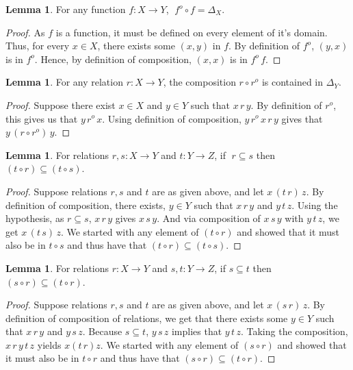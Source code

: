 \documentclass[a4paper]{article}
\theoremstyle{definition}
\newtheorem{lemma}[theorem]{Lemma}
\begin{document}
			\begin{lemma}
				For any function $f:X \to Y$, $\; f^o \circ f=\Delta_X$.
			\end{lemma}
			\begin{proof}\setcounter{equation}{0}

				As $f$ is a function, it must be defined on every element of it's domain. Thus, for every
				$x \in X$, there exists some $(x,y)$ in $f$. By definition of $f^o$, $(y,x)$ is in $f^o$.
				Hence, by definition of composition, $(x,x)$ is in $f^o \,f$.
			\end{proof}
			\begin{lemma}
				For any relation $r:X \to Y$, the composition $r\circ r^o$ is contained in $\Delta_Y$.
			\end{lemma}
			\begin{proof}\setcounter{equation}{0}

				Suppose there exist $x \in X$ and $y \in Y$ such that
				$x\,r\,y$. By definition of $r^o$, this
				gives us that $y\, r^o \,x$. Using definition of composition,
				$y\, r^o \,x \,r\,y$ gives that	$y\, (r \circ r^o)\, y$.
			\end{proof}
			\begin{lemma} For relations $r,s:X\to Y$ and $t:Y\to Z$, if $\;r \subseteq s$ then $(t \circ r) \subseteq (t \circ s)$.
			\end{lemma}
			\begin{proof}\setcounter{equation}{0}

				Suppose relations $r,s$ and $t$ are as given above, and let $x \,(t \, r)\,z$.
				By definition of composition, there
				exists, $y \in Y$ such that $x\,r\,y$ and $y\,t\,z$.
				Using the hypothesis, as $r \subseteq  s $,
				$x\,r\,y$ gives $x\,s\,y$. And via composition of $x\,s\,y$ with $y \, t \, z $, we get
				$x\,(t\,s)\, z$. We started with any element of $(t \circ r)$ and showed that
				it must also be in $t \circ s$ and thus have that $(t \circ r) \subseteq (t \circ s)$.
			\end{proof}
			\begin{lemma} For relations $r:X\to Y$ and $s,t:Y\to Z$, if $s\subseteq t$ then
				$(s \circ r) \subseteq (t \circ r)$.
			\end{lemma}
			\begin{proof}\setcounter{equation}{0}

				Suppose relations $r,s$ and $t$ are as given above, and let  $x \,(s \, r)\,z$.
				By definition of composition of relations, we get that there exists
				some $y \in Y$ such that $x\,r\,y$ and $y\,s\,z$. Because $s \subseteq t$, $y\,s\,z$
				implies that $y\,t\,z$. Taking the composition, $x\,r\,y\,t\,z$ yields $x(t\,r)z$.
				We started with any element of $(s \circ r)$ and showed that it must also be in
				$t \circ r$ and thus have that $(s \circ r) \subseteq (t \circ r)$.
			\end{proof}
\end{document}
